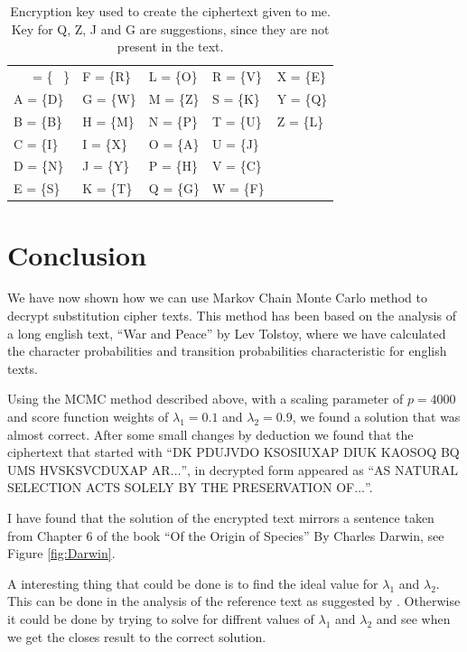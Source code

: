 \documentclass[a4paper, 11pt]{article}
\begin{document}
\begin{table}[h]
  \centering
  \caption{Encryption key used to create the ciphertext given to me.
  Key for Q, Z, J and G are suggestions, since they are not present in the
  text.}
  \begin{tabular}{l l l l l}
  \ \ \ = \{ \ \}  &  F = \{R\}  &  L = \{O\}  &  R = \{V\}  &  X = \{E\} \\
  A = \{D\}  &  G = \{W\}  &  M = \{Z\}  &  S = \{K\}  &  Y = \{Q\}  \\
  B = \{B\}  &  H = \{M\}  &  N = \{P\}  &  T = \{U\}  &  Z = \{L\}  \\
  C = \{I\}  &  I = \{X\}  &  O = \{A\}  &  U = \{J\}  &  \ \\
  D = \{N\}  &  J = \{Y\}  &  P = \{H\}  &  V = \{C\}  &  \ \\
  E = \{S\}  &  K = \{T\}  &  Q = \{G\}  &  W = \{F\}  &  \ \\
  \end{tabular}
  \label{tab:CipherKey}
\end{table}


\section{Conclusion}

We have now shown how we can use Markov Chain Monte Carlo method to
decrypt substitution cipher texts. This method has been based on the analysis
of a long english text, ``War and Peace'' by Lev Tolstoy, where we have
calculated the character probabilities and transition probabilities 
characteristic for english texts.

Using the MCMC method described above, with a scaling parameter of $p = 4000$
and score function weights of $\lambda_1 = 0.1$ and $\lambda_2 = 0.9$, we found
a solution that was almost correct. After some small changes by deduction we
found that the ciphertext that started with ``DK PDUJVDO KSOSIUXAP DIUK  
KAOSOQ BQ UMS HVSKSVCDUXAP AR$\dots$'', in decrypted form appeared as
``AS NATURAL SELECTION ACTS SOLELY BY THE PRESERVATION OF$\dots$''.

I have found that the solution of the encrypted text mirrors a sentence 
taken from Chapter 6 of the book ``Of the Origin of Species'' By Charles Darwin,
see Figure \ref{fig:Darwin}.

A interesting thing that could be done is to find the ideal value for 
$\lambda_1$ and $\lambda_2$. This can be done in the analysis of the 
reference text as suggested by \cite{Kocmanek}. Otherwise it could be done 
by trying to solve for diffrent values of $\lambda_1$ and $\lambda_2$ and see
when we get the closes result to the correct solution.
\end{document}
